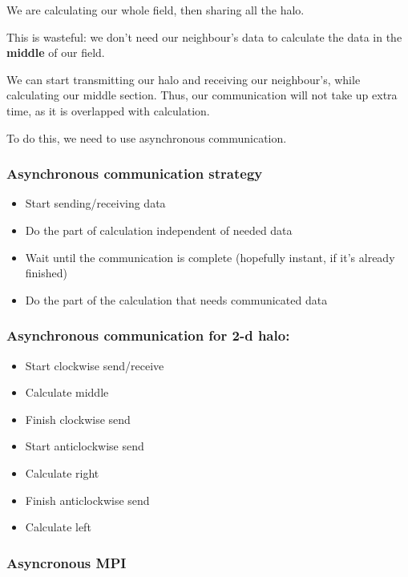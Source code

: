 We are calculating our whole field, then sharing all the halo.

This is wasteful: we don't need our neighbour's data to calculate the
data in the \textbf{middle} of our field.

We can start transmitting our halo and receiving our neighbour's, while
calculating our middle section. Thus, our communication will not take up
extra time, as it is overlapped with calculation.

To do this, we need to use asynchronous communication.

\subsubsection{Asynchronous communication
strategy}\label{asynchronous-communication-strategy}

\begin{itemize}
\itemsep1pt\parskip0pt
\item
  Start sending/receiving data
\item
  Do the part of calculation independent of needed data
\item
  Wait until the communication is complete (hopefully instant, if it's
  already finished)
\item
  Do the part of the calculation that needs communicated data
\end{itemize}

\subsubsection{Asynchronous communication for 2-d
halo:}\label{asynchronous-communication-for-2-d-halo}

\begin{itemize}
\itemsep1pt\parskip0pt
\item
  Start clockwise send/receive
\item
  Calculate middle
\item
  Finish clockwise send
\item
  Start anticlockwise send
\item
  Calculate right
\item
  Finish anticlockwise send
\item
  Calculate left
\end{itemize}

\subsubsection{Asyncronous MPI}\label{asyncronous-mpi}

